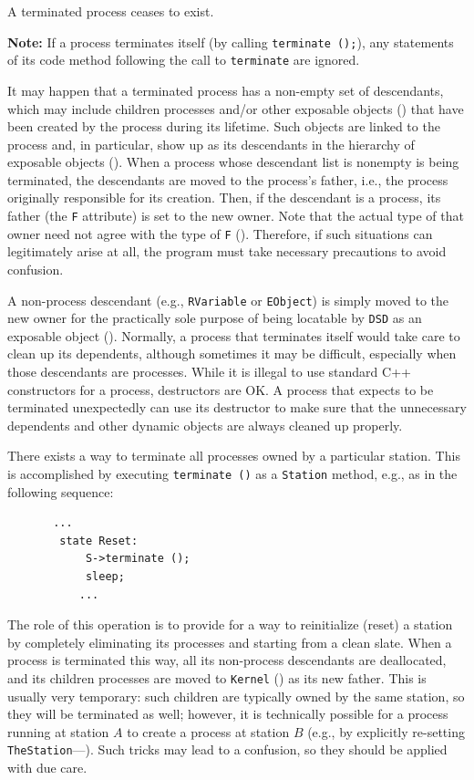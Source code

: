 \noindent
A terminated process ceases to exist.

\medskip

\noindent
{\bf Note:} If a process terminates itself (by calling {\tt terminate~();}),
any statements of its code method
following the call to {\tt terminate} are ignored.

\medskip

It may happen that a terminated process has a non-empty set of descendants,
which may include children processes and/or other exposable objects
() that
have been created by the process during its lifetime.
Such objects are linked to the process and, in particular, show up as its
descendants in the hierarchy of exposable objects ().
When a process whose descendant list is nonempty is being terminated,
the descendants are moved to the process's father, i.e., the process
originally responsible for its creation.
Then, if the descendant is a process, its father (the {\tt F} attribute)
is set to the new owner.
Note that the actual type of that owner need not agree with the type of
{\tt F} ().
Therefore, if such situations can legitimately arise at all, the program must
take necessary precautions to avoid confusion.

A non-process descendant (e.g., {\tt RVariable} or {\tt EObject}) is simply
moved to the new owner for the practically sole purpose of being locatable
by {\tt DSD} as an exposable object ().
Normally, a process that terminates itself would take care to clean up its
dependents, although sometimes it may be difficult, especially when those
descendants are processes.
While it is illegal to use standard C++ constructors for a process, destructors
are OK.
A process that expects to be terminated unexpectedly
can use its destructor to make sure that the unnecessary dependents and other
dynamic objects are always cleaned up properly.

There exists a way to terminate all processes owned by a particular station.
This is accomplished by executing {\tt terminate ()} as a {\tt Station}
method, e.g., as in the following sequence:
\begin{verbatim}
       ...
        state Reset:
            S->terminate ();
            sleep;
           ...
\end{verbatim}
The role of this operation is to provide for a way to reinitialize (reset)
a station
by completely eliminating its processes and starting from a clean slate.
When a process is terminated this way, all its non-process descendants are
deallocated, and its children processes are moved to {\tt Kernel}
() as its new father.
This is usually very temporary: such children are typically owned by the
same station, so they will be terminated as well; however, it is technically
possible for a process running at station $A$ to create a process at station
$B$ (e.g., by explicitly re-setting {\tt TheStation}---).
Such tricks may lead to a confusion, so they should be applied with due care.

